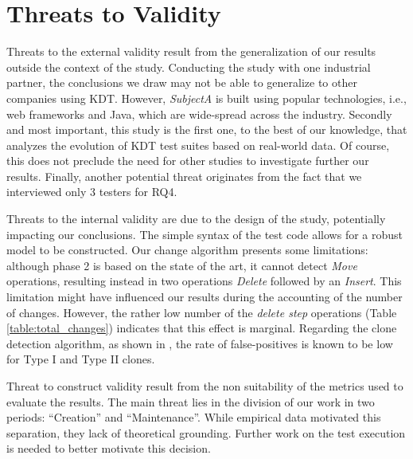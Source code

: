 \section{Threats to Validity}

Threats to the external validity result from the generalization of our results outside the context of the study. Conducting the study with one industrial partner, the conclusions we draw may not be able to generalize to other companies using KDT. However, \emph{SubjectA} is built using popular technologies, i.e., web frameworks and Java, which are wide-spread across the industry. Secondly and most important, this study is the first one, to the best of our knowledge, that analyzes the evolution of KDT test suites based on real-world data. Of course, this does not preclude the need for other studies to investigate further our results. Finally, another potential threat originates from the fact that we interviewed only 3 testers for RQ4.

Threats to the internal validity are due to the design of the study, potentially impacting our conclusions. The simple syntax of the test code allows for a robust model to be constructed. Our change algorithm presents some limitations: although phase 2 is based on the state of the art, it cannot detect \emph{Move} operations, resulting instead in two operations \emph{Delete} followed by an \emph{Insert}. This limitation might have influenced our results during the accounting of the number of changes. However, the rather low number of the \emph{delete step} operations (Table \ref{table:total_changes}) indicates that this effect is marginal. Regarding the clone detection algorithm, as shown in \cite{Roy2009}, the rate of false-positives is known to be low for Type I and Type II clones.

Threat to construct validity result from the non suitability of the metrics used to evaluate the results. The main threat lies in the division of our work in two periods: ``Creation'' and ``Maintenance''. While empirical data motivated this separation, they lack of theoretical grounding. Further work on the test execution is needed to better motivate this decision.
